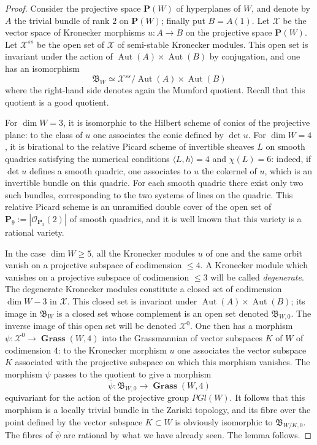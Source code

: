 \documentclass[12pt,english]{smfart}%
\theoremstyle{plain}
\theoremstyle{definition}
\theoremstyle{remark}
\newcommand{\PP}{\mathbf{P}}
\newcommand{\Oo}{\mathcal{O}}
\DeclareMathOperator{\Aut}{Aut}
\DeclareMathOperator{\Grass}{\mathbf{Grass}}
\newcommand{\origpage}[1]{\marginnote{\scriptsize\itshape p.~#1}}
\begin{document}
\begin{proof}
Consider the projective space $\PP(W)$ of hyperplanes of $W$, and denote by $A$ the trivial bundle of rank $2$ on $\PP(W)$; finally put $B=A(1)$. Let $\mathscr{X}$ be the vector space of Kronecker morphisms $u:A\to B$ on the projective space $\PP(W)$. Let $\mathscr{X}^{ss}$ be the open set of $\mathscr{X}$ of semi-stable Kronecker modules. This open set is invariant under the action of $\Aut(A)\times\Aut(B)$ by conjugation, and one has an isomorphism
\[
\mathfrak{B}_W \simeq \mathscr{X}^{ss}/\Aut(A)\times\Aut(B)
\]
where the right-hand side denotes again the Mumford quotient. Recall that this quotient is a good quotient.

For $\dim W=3$, it is isomorphic to the Hilbert scheme of conics of the projective plane: to the class of $u$ one associates the conic defined by $\det u$. For $\dim W=4$, it is birational to the relative Picard scheme of invertible sheaves $L$ on smooth quadrics satisfying the numerical conditions $\langle L,h\rangle = 4$ and $\chi(L)=6$: indeed, if $\det u$ defines a smooth quadric, one associates to $u$ the cokernel of $u$, which is an invertible bundle on this quadric. For each smooth quadric there exist only two such bundles, corresponding to the two systems of lines on the quadric. This relative Picard scheme is an unramified double cover of the open set of $\PP_9:=|\Oo_{\PP_3}(2)|$ of smooth quadrics, and it is well known that this variety is a rational variety.

In the case $\dim W\ge 5$, all the Kronecker modules $u$ of one and the same orbit vanish on a projective subspace of codimension $\le 4$. A Kronecker module which vanishes on a projective subspace of codimension $\le 3$ will be called \emph{degenerate}. The degenerate Kronecker modules constitute a closed set of codimension $\dim W-3$ in $\mathscr{X}$. This closed set is invariant under $\Aut(A)\times\Aut(B)$; its image in $\mathfrak{B}_W$ is a closed set whose complement is an open set denoted $\mathfrak{B}_{W,0}$. The inverse image of this open set will be denoted $\mathscr{X}^0$. One then has a morphism $\psi:\mathscr{X}^0\to \Grass(W,4)$ into the Grassmannian of vector subspaces $K$ of $W$ of codimension $4$: to the Kronecker morphism $u$ one associates the vector subspace $K$ associated with the projective subspace on which this morphism vanishes. The morphism $\psi$ passes to the quotient to give a morphism
\[
\bar\psi : \mathfrak{B}_{W,0}\longrightarrow \Grass(W,4)
\]
\origpage{676}%
equivariant for the action of the projective group $PGl(W)$. It follows that this morphism is a locally trivial bundle in the Zariski topology, and its fibre over the point defined by the vector subspace $K\subset W$ is obviously isomorphic to $\mathfrak{B}_{W/K,0}$. The fibres of $\bar\psi$ are rational by what we have already seen. The lemma follows.
\end{proof}
\end{document}
